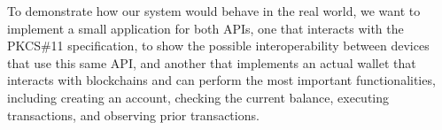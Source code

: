 To demonstrate how our system would behave in the real world, we want to implement a small application for both APIs, one that interacts with the PKCS\#11 specification, to show the possible interoperability between devices that use this same API, and another that implements an actual wallet that interacts with blockchains and can perform the most important functionalities, including creating an account, checking the current balance, executing transactions, and observing prior transactions. 

